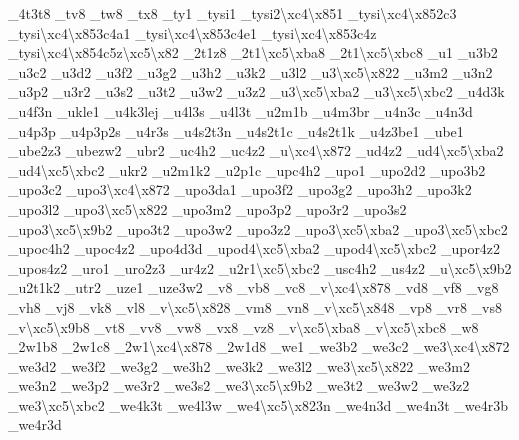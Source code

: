 \begin{DoxyCompactItemize}
\-\_\-4t3t8 \-\_\-tv8 \-\_\-tw8 \-\_\-tx8 \-\_\-ty1 \-\_\-tysi1 \-\_\-tysi2\textbackslash{}xc4\textbackslash{}x851 \-\_\-tysi\textbackslash{}xc4\textbackslash{}x852c3 \-\_\-tysi\textbackslash{}xc4\textbackslash{}x853c4a1 \-\_\-tysi\textbackslash{}xc4\textbackslash{}x853c4e1 \-\_\-tysi\textbackslash{}xc4\textbackslash{}x853c4z \-\_\-tysi\textbackslash{}xc4\textbackslash{}x854c5z\textbackslash{}xc5\textbackslash{}x82 \-\_\-2t1z8 \-\_\-2t1\textbackslash{}xc5\textbackslash{}xba8 \-\_\-2t1\textbackslash{}xc5\textbackslash{}xbc8 \-\_\-u1 \-\_\-u3b2 \-\_\-u3c2 \-\_\-u3d2 \-\_\-u3f2 \-\_\-u3g2 \-\_\-u3h2 \-\_\-u3k2 \-\_\-u3l2 \-\_\-u3\textbackslash{}xc5\textbackslash{}x822 \-\_\-u3m2 \-\_\-u3n2 \-\_\-u3p2 \-\_\-u3r2 \-\_\-u3s2 \-\_\-u3t2 \-\_\-u3w2 \-\_\-u3z2 \-\_\-u3\textbackslash{}xc5\textbackslash{}xba2 \-\_\-u3\textbackslash{}xc5\textbackslash{}xbc2 \-\_\-u4d3k \-\_\-u4f3n \-\_\-ukle1 \-\_\-u4k3lej \-\_\-u4l3s \-\_\-u4l3t \-\_\-u2m1b \-\_\-u4m3br \-\_\-u4n3c \-\_\-u4n3d \-\_\-u4p3p \-\_\-u4p3p2s \-\_\-u4r3s \-\_\-u4s2t3n \-\_\-u4s2t1c \-\_\-u4s2t1k \-\_\-u4z3be1 \-\_\-ube1 \-\_\-ube2z3 \-\_\-ubezw2 \-\_\-ubr2 \-\_\-uc4h2 \-\_\-uc4z2 \-\_\-u\textbackslash{}xc4\textbackslash{}x872 \-\_\-ud4z2 \-\_\-ud4\textbackslash{}xc5\textbackslash{}xba2 \-\_\-ud4\textbackslash{}xc5\textbackslash{}xbc2 \-\_\-ukr2 \-\_\-u2m1k2 \-\_\-u2p1c \-\_\-upc4h2 \-\_\-upo1 \-\_\-upo2d2 \-\_\-upo3b2 \-\_\-upo3c2 \-\_\-upo3\textbackslash{}xc4\textbackslash{}x872 \-\_\-upo3da1 \-\_\-upo3f2 \-\_\-upo3g2 \-\_\-upo3h2 \-\_\-upo3k2 \-\_\-upo3l2 \-\_\-upo3\textbackslash{}xc5\textbackslash{}x822 \-\_\-upo3m2 \-\_\-upo3p2 \-\_\-upo3r2 \-\_\-upo3s2 \-\_\-upo3\textbackslash{}xc5\textbackslash{}x9b2 \-\_\-upo3t2 \-\_\-upo3w2 \-\_\-upo3z2 \-\_\-upo3\textbackslash{}xc5\textbackslash{}xba2 \-\_\-upo3\textbackslash{}xc5\textbackslash{}xbc2 \-\_\-upoc4h2 \-\_\-upoc4z2 \-\_\-upo4d3d \-\_\-upod4\textbackslash{}xc5\textbackslash{}xba2 \-\_\-upod4\textbackslash{}xc5\textbackslash{}xbc2 \-\_\-upor4z2 \-\_\-upos4z2 \-\_\-uro1 \-\_\-uro2z3 \-\_\-ur4z2 \-\_\-u2r1\textbackslash{}xc5\textbackslash{}xbc2 \-\_\-usc4h2 \-\_\-us4z2 \-\_\-u\textbackslash{}xc5\textbackslash{}x9b2 \-\_\-u2t1k2 \-\_\-utr2 \-\_\-uze1 \-\_\-uze3w2 \-\_\-v8 \-\_\-vb8 \-\_\-vc8 \-\_\-v\textbackslash{}xc4\textbackslash{}x878 \-\_\-vd8 \-\_\-vf8 \-\_\-vg8 \-\_\-vh8 \-\_\-vj8 \-\_\-vk8 \-\_\-vl8 \-\_\-v\textbackslash{}xc5\textbackslash{}x828 \-\_\-vm8 \-\_\-vn8 \-\_\-v\textbackslash{}xc5\textbackslash{}x848 \-\_\-vp8 \-\_\-vr8 \-\_\-vs8 \-\_\-v\textbackslash{}xc5\textbackslash{}x9b8 \-\_\-vt8 \-\_\-vv8 \-\_\-vw8 \-\_\-vx8 \-\_\-vz8 \-\_\-v\textbackslash{}xc5\textbackslash{}xba8 \-\_\-v\textbackslash{}xc5\textbackslash{}xbc8 \-\_\-w8 \-\_\-2w1b8 \-\_\-2w1c8 \-\_\-2w1\textbackslash{}xc4\textbackslash{}x878 \-\_\-2w1d8 \-\_\-we1 \-\_\-we3b2 \-\_\-we3c2 \-\_\-we3\textbackslash{}xc4\textbackslash{}x872 \-\_\-we3d2 \-\_\-we3f2 \-\_\-we3g2 \-\_\-we3h2 \-\_\-we3k2 \-\_\-we3l2 \-\_\-we3\textbackslash{}xc5\textbackslash{}x822 \-\_\-we3m2 \-\_\-we3n2 \-\_\-we3p2 \-\_\-we3r2 \-\_\-we3s2 \-\_\-we3\textbackslash{}xc5\textbackslash{}x9b2 \-\_\-we3t2 \-\_\-we3w2 \-\_\-we3z2 \-\_\-we3\textbackslash{}xc5\textbackslash{}xbc2 \-\_\-we4k3t \-\_\-we4l3w \-\_\-we4\textbackslash{}xc5\textbackslash{}x823n \-\_\-we4n3d \-\_\-we4n3t \-\_\-we4r3b \-\_\-we4r3d 
\end{DoxyCompactItemize}
